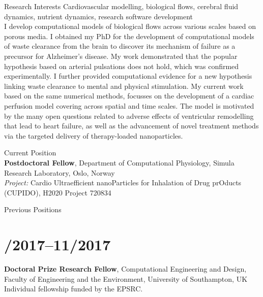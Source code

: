 \documentclass[margin,line,10pt]{res}
\begin{document}

\address{alexandra.diem@gmail.com, \url{https://www.akdiem.com}, \url{https://github.com/akdiem}}

\begin{resume}

  {\sc Research Interests} Cardiovascular modelling, biological flows, cerebral fluid dynamics, nutrient dynamics, research software development\\

I develop computational models of biological flows across various scales based on porous media. I obtained my PhD for the development of computational models of waste clearance from the brain to discover its mechanism of failure as a precursor for Alzheimer's disease. My work demonstrated that the popular hypothesis based on arterial pulsations does not hold, which was confirmed experimentally. I further provided computational evidence for a new hypothesis linking waste clearance to mental and physical stimulation. My current work based on the same numerical methods, focusses on the development of a cardiac perfusion model covering across spatial and time scales. The model is motivated by the many open questions related to adverse effects of ventricular remodelling that lead to heart failure, as well as the advancement of novel treatment methods via the targeted delivery of therapy-loaded nanoparticles.\\

\vspace*{-.2in}

{\sc Current Position}\\
{\bf Postdoctoral Fellow}, Department of Computational Physiology, Simula Research Laboratory, Oslo, Norway\\
{\em Project:} Cardio Ultraefficient nanoParticles for Inhalation of Drug prOducts (CUPIDO), H2020 Project 720834\\

\vspace*{-.2in}

{\sc Previous Positions}\\
\vspace*{-.35in}
\section{/2017--11/2017}{\bf Doctoral Prize Research Fellow}, Computational Engineering and Design, Faculty of Engineering and the Environment, University of Southampton, UK\\
Individual fellowship funded by the EPSRC.\\


\end{resume}
\end{document}

